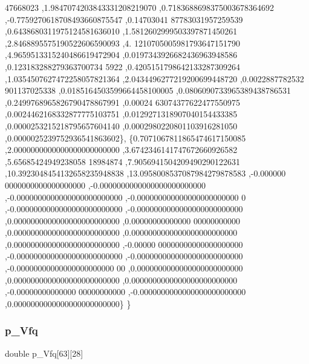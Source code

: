 \begin{DoxyCode}
      47668023 ,1.9847074203843331208219070 ,0.7183688698375003678364692 ,-0.7759270618708493660875547 ,0.14703041
      87783031957259539 ,0.6438680311975124581636010 ,1.5812602999503397871450261 ,2.8468895575190522606590093 ,4.
      1210705005981793647151790 ,4.9659513315240486619472904 ,0.0197343926682436963948586 ,0.123183288279363700734
      5922 ,0.4205151798642133287309264 ,1.0354507627472258057821364 ,2.0434496277219200699448720 ,0.0022887782532
      901137025338 ,0.0185164503599664458100005 ,0.0806090733965389438786531 ,0.2499768965826790478867991 ,0.00024
      63074377622477550975 ,0.0024462168332877775103751 ,0.0129271318907040154433385 ,0.0000253215218795657604140 
      ,0.0002980220801103916281050 ,0.0000025239752936541863602\},
\{0.7071067811865474617150085 ,2.0000000000000000000000000 ,3.6742346141747672660926582 ,5.65685424949238058
      18984874 ,7.9056941504209490290122631 ,10.3923048454132658235948838 ,13.0958008537087984279878583 ,-0.000000
      0000000000000000000 ,-0.0000000000000000000000000 ,-0.0000000000000000000000000 ,-0.000000000000000000000000
      0 ,-0.0000000000000000000000000 ,-0.0000000000000000000000000 ,0.0000000000000000000000000 ,0.00000000000000
      00000000000 ,0.0000000000000000000000000 ,0.0000000000000000000000000 ,0.0000000000000000000000000 ,-0.00000
      00000000000000000000 ,-0.0000000000000000000000000 ,-0.0000000000000000000000000 ,-0.00000000000000000000000
      00 ,0.0000000000000000000000000 ,0.0000000000000000000000000 ,0.0000000000000000000000000 ,-0.00000000000000
      00000000000 ,-0.0000000000000000000000000 ,0.0000000000000000000000000\}
\}
\end{DoxyCode}
\mbox{\label{a01002_a3c97c376756f76d4af9fa5b062861b65}} 
\subsubsection{\texorpdfstring{p\+\_\+\+Vfq}{p\_Vfq}}
{\footnotesize\ttfamily double p\+\_\+\+Vfq\mbox{[}63\mbox{]}\mbox{[}28\mbox{]}}

\mbox{\label{a01002_acfbf26571e02c70e482be22db1c107a4}} 

